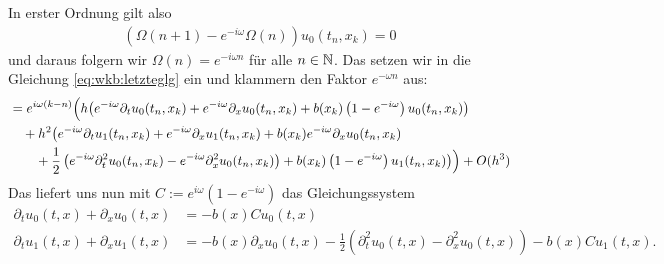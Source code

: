 In erster Ordnung gilt also
\begin{align}
\left( \Omega(n+1) - e^{-i \omega} \Omega(n)  \right) u_0(t_n, x_k) = 0
\end{align}
und daraus folgern wir $\Omega(n) = e^{- i \omega n}$ für alle $n \in \mathbb N$.
Das setzen wir in die Gleichung \eqref{eq:wkb:letzteglg} ein und klammern den
Faktor $e^{- \omega n}$ aus:
\begin{align}
\begin{split}
&= e^{i \omega (k - n)} \Bigl(
h \bigl( e^{-i \omega} \partial_t u_0(t_n, x_k) + e^{-i \omega} \partial_x u_0(t_n, x_k) + b(x_k) \left(1-e^{-i \omega}\right) u_0(t_n, x_k) \bigr)\\
&\quad + h^2 \bigl( e^{-i \omega} \partial_t u_1(t_n, x_k) + e^{-i \omega} \partial_x u_1(t_n, x_k) + b(x_k) e^{-i \omega} \partial_x u_0(t_n, x_k)\\
&\qquad + \frac{1}{2} \left( e^{-i \omega} \partial^2_t u_0(t_n, x_k) - e^{-i \omega} \partial^2_x u_0(t_n, x_k) \right)  + b(x_k) \left(1-e^{-i \omega}\right) u_1(t_n, x_k) \bigr) 
\Bigr) + O(h^3)
\end{split}
\end{align}
Das liefert uns nun mit $C := e^{i \omega} \left(1-e^{-i \omega}\right)$ das Gleichungssystem
\begin{align}
\partial_t u_0(t, x) + \partial_x u_0(t, x) &= - b(x) C u_0(t, x)\\
\partial_t u_1(t, x) + \partial_x u_1(t, x) &= - b(x) \partial_x u_0(t, x) - \frac{1}{2} \left( \partial^2_t u_0(t, x) - \partial^2_x u_0(t, x) \right) - b(x) C u_1(t, x).
\end{align}